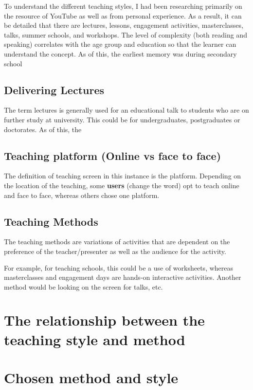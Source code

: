 \documentclass[12pt, a4paper,oneside]{book}
\numberwithin{equation}{section}
\begin{document}
To understand the different teaching styles, I had been researching primarily on the resource of YouTube as well as from personal experience. As a result, it can be detailed that there are lectures, lessons, engagement activities, masterclasses, talks, summer schools, and workshops. The level of complexity (both reading and speaking) correlates with the age group and education so that the learner can understand the concept. As of this, the earliest memory was during secondary school 

\subsection{Delivering Lectures}
The term lectures is generally used for an educational talk to students who are on further study at university. This could be for undergraduates, postgraduates or doctorates. As of this, the

\subsection{Teaching platform (Online vs face to face)}

The definition of teaching screen in this instance is the platform. Depending on the location of the teaching, some \textbf{users} (change the word) opt to teach online and face to face, whereas others chose one platform.

\subsection{Teaching Methods}

The teaching methods are variations of activities that are dependent on the preference of the teacher/presenter as well as the audience for the activity.

For example, for teaching schools, this could be a use of worksheets, whereas masterclasses and engagement days are hands-on interactive activities. Another method would be looking on the screen for talks, etc.

\section{The relationship between the teaching style and method}

\section{Chosen method and style}
\end{document}
